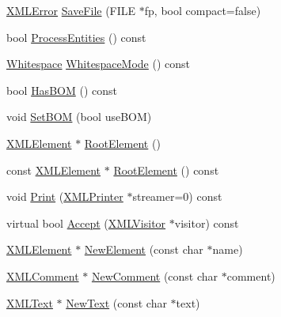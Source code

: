 \begin{DoxyCompactItemize}
\item 
\hyperlink{namespacetinyxml2_a1fbf88509c3ac88c09117b1947414e08}{X\-M\-L\-Error} \hyperlink{classtinyxml2_1_1_x_m_l_document_a8b95779479a0035acc67b3a61dfe1b74}{Save\-File} (F\-I\-L\-E $\ast$fp, bool compact=false)
\item 
bool \hyperlink{classtinyxml2_1_1_x_m_l_document_adfcff7d0599cd520e9fcbb8891e1b678}{Process\-Entities} () const 
\item 
\hyperlink{namespacetinyxml2_a7f91d00f77360f850fd5da0861e27dd5}{Whitespace} \hyperlink{classtinyxml2_1_1_x_m_l_document_a94b3ea2f77c9ac831723984df5a02d01}{Whitespace\-Mode} () const 
\item 
bool \hyperlink{classtinyxml2_1_1_x_m_l_document_a530649e9de7e5aa8df9c37f66197fcb6}{Has\-B\-O\-M} () const 
\item 
void \hyperlink{classtinyxml2_1_1_x_m_l_document_a14419b698f7c4b140df4e80f3f0c93b0}{Set\-B\-O\-M} (bool use\-B\-O\-M)
\item 
\hyperlink{classtinyxml2_1_1_x_m_l_element}{X\-M\-L\-Element} $\ast$ \hyperlink{classtinyxml2_1_1_x_m_l_document_ad2b70320d3c2a071c2f36928edff3e1c}{Root\-Element} ()
\item 
const \hyperlink{classtinyxml2_1_1_x_m_l_element}{X\-M\-L\-Element} $\ast$ \hyperlink{classtinyxml2_1_1_x_m_l_document_a23a25b573d2adf3ee6075636c2a31c73}{Root\-Element} () const 
\item 
void \hyperlink{classtinyxml2_1_1_x_m_l_document_a686ea28672c0e0c60383ec28148c1ac0}{Print} (\hyperlink{classtinyxml2_1_1_x_m_l_printer}{X\-M\-L\-Printer} $\ast$streamer=0) const 
\item 
virtual bool \hyperlink{classtinyxml2_1_1_x_m_l_document_aa08503d24898bf9992ae5e5fb8b0cf87}{Accept} (\hyperlink{classtinyxml2_1_1_x_m_l_visitor}{X\-M\-L\-Visitor} $\ast$visitor) const 
\item 
\hyperlink{classtinyxml2_1_1_x_m_l_element}{X\-M\-L\-Element} $\ast$ \hyperlink{classtinyxml2_1_1_x_m_l_document_a3c335a700a43d7c363a393142a23f234}{New\-Element} (const char $\ast$name)
\item 
\hyperlink{classtinyxml2_1_1_x_m_l_comment}{X\-M\-L\-Comment} $\ast$ \hyperlink{classtinyxml2_1_1_x_m_l_document_a386df0befd06aadb5e0cd21381aa955a}{New\-Comment} (const char $\ast$comment)
\item 
\hyperlink{classtinyxml2_1_1_x_m_l_text}{X\-M\-L\-Text} $\ast$ \hyperlink{classtinyxml2_1_1_x_m_l_document_acece5de77a0819f2341b08c1e1ed9987}{New\-Text} (const char $\ast$text)
\item 

\end{DoxyCompactItemize}
